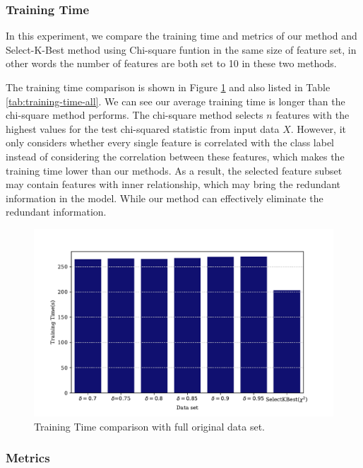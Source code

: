 \documentclass{ieeeaccess}
\theoremstyle{definition}
\begin{document}
\subsubsection{Training Time}

In this experiment, we compare the training time and metrics of our method and Select-K-Best method using Chi-square funtion in the same size of feature set, in other words the number of features are both set to 10 in these two methods.

The training time comparison is shown in Figure \ref{fig:training-time-with-chi2} and also listed in Table \ref{tab:training-time-all}. We can see our average training time is longer than the chi-square method performs. The chi-square method selects $n$ features with the highest values for the test chi-squared statistic from input data $X$. However, it only considers whether every single feature is correlated with the class label instead of considering the correlation between these features, which makes the training time lower than our methods. 
As a result, the selected feature subset may contain features with inner relationship, which may bring the redundant information in the model. While our method can effectively eliminate the redundant information. 

\begin{figure}[!htpb]
    \centering
    \includegraphics[scale=0.4]{fig/training-time-chi2.pdf}
    \caption{Training Time comparison with full original data set.}
    \label{fig:training-time-with-chi2}
\end{figure}

\subsubsection{Metrics}
\end{document}
